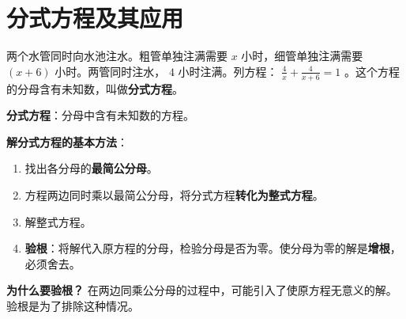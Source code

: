 \section*{分式方程及其应用}


\begin{explore}


两个水管同时向水池注水。粗管单独注满需要 $x$ 小时，细管单独注满需要 $(x+6)$ 小时。两管同时注水， $4$ 小时注满。列方程： $\frac{4}{x} + \frac{4}{x + 6} = 1$ 。这个方程的分母含有未知数，叫做\textbf{分式方程}。

\end{explore}

\begin{understand}


\textbf{分式方程}：分母中含有未知数的方程。

\textbf{解分式方程的基本方法}：

\begin{enumerate}
  \item 找出各分母的\textbf{最简公分母}。
  \item 方程两边同时乘以最简公分母，将分式方程\textbf{转化为整式方程}。
  \item 解整式方程。
  \item \textbf{验根}：将解代入原方程的分母，检验分母是否为零。使分母为零的解是\textbf{增根}，必须舍去。
\end{enumerate}


\textbf{为什么要验根？} 在两边同乘公分母的过程中，可能引入了使原方程无意义的解。验根是为了排除这种情况。

\end{understand}


